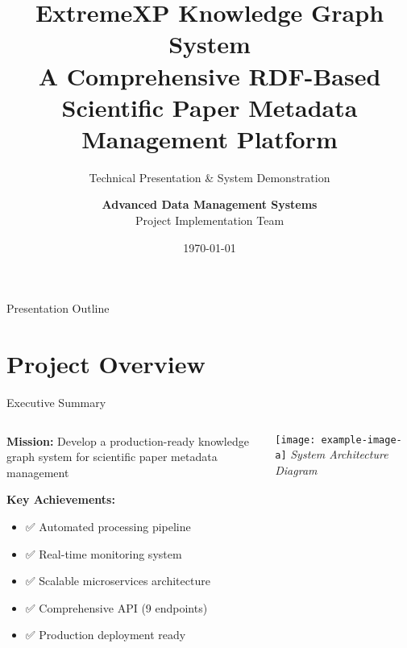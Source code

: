 \documentclass[aspectratio=169]{beamer}
\title[ExtremeXP Knowledge Graph System]{
    \textbf{ExtremeXP Knowledge Graph System}\\
    \large{A Comprehensive RDF-Based Scientific Paper Metadata Management Platform}
}
\subtitle{Technical Presentation \& System Demonstration}
\author[Team]{
    \textbf{Advanced Data Management Systems}\\
    Project Implementation Team
}
\institute[University]{
    Department of Computer Science\\
    Advanced Database Systems Course
}
\date{\today}
\begin{document}
\begin{frame}
    \titlepage
\end{frame}

\begin{frame}{Presentation Outline}
    \tableofcontents
\end{frame}

\section{Project Overview}

\begin{frame}{Executive Summary}
    \begin{columns}[c]
        \begin{column}{0.6\textwidth}
            \textbf{Mission:} Develop a production-ready knowledge graph system for scientific paper metadata management
            
            \vspace{0.5cm}
            \textbf{Key Achievements:}
            \begin{itemize}
                \item ✅ Automated processing pipeline
                \item ✅ Real-time monitoring system
                \item ✅ Scalable microservices architecture
                \item ✅ Comprehensive API (9 endpoints)
                \item ✅ Production deployment ready
            \end{itemize}
        \end{column}
        \begin{column}{0.4\textwidth}
            \begin{center}
                \texttt{[image: example-image-a]}
                \textit{System Architecture Diagram}
            \end{center}
        \end{column}
    \end{columns}
\end{frame}
\end{document}
